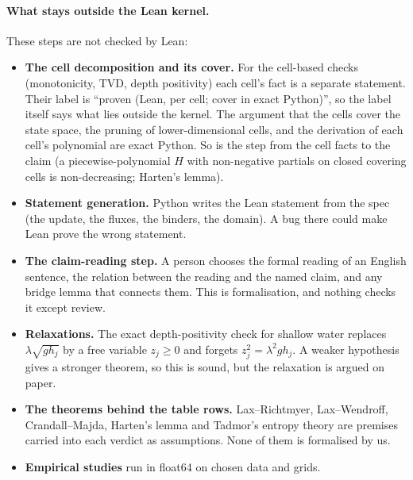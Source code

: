 \documentclass[11pt,a4paper]{article}
\begin{document}
\paragraph{What stays outside the Lean kernel.} These steps are not checked by Lean:
\begin{itemize}
\item \textbf{The cell decomposition and its cover.} For the cell-based checks (monotonicity, TVD,
  depth positivity) each cell's fact is a separate statement. Their label is
  ``proven (Lean, per cell; cover in exact Python)'', so the label itself says what lies outside the
  kernel. The argument that the cells cover the
  state space, the pruning of lower-dimensional cells, and the derivation of each cell's polynomial are
  exact Python. So is the step from the cell facts to the claim (a piecewise-polynomial $H$ with
  non-negative partials on closed covering cells is non-decreasing; Harten's lemma).
\item \textbf{Statement generation.} Python writes the Lean statement from the spec (the update, the
  fluxes, the binders, the domain). A bug there could make Lean prove the wrong statement.
\item \textbf{The claim-reading step.} A person chooses the formal reading of an English sentence, the
  relation between the reading and the named claim, and any bridge lemma that connects them. This is
  formalisation, and nothing checks it except review.
\item \textbf{Relaxations.} The exact depth-positivity check for shallow water replaces
  $\lambda\sqrt{g h_j}$ by a free variable $z_j \ge 0$ and forgets $z_j^2 = \lambda^2 g h_j$. A
  weaker hypothesis gives a stronger theorem, so this is sound, but the relaxation is argued on paper.
\item \textbf{The theorems behind the table rows.} Lax--Richtmyer, Lax--Wendroff, Crandall--Majda,
  Harten's lemma and Tadmor's entropy theory are premises carried into each verdict as assumptions.
  None of them is formalised by us.
\item \textbf{Empirical studies} run in float64 on chosen data and grids.
\end{itemize}
\end{document}
